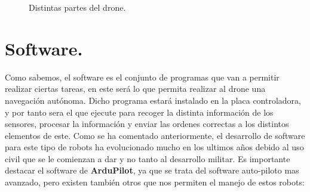 \begin{figure}[H]
 \centering
 \caption{Distintas partes del drone.}
 \label{f:Test 1}
\end{figure} 


\section{Software.}
\hspace{1 cm} Como sabemos, el software es el conjunto de programas que van a permitir realizar ciertas tareas, en este ser\'a lo que permita realizar al drone una navegaci\'on aut\'onoma. Dicho programa estar\'a instalado en la placa controladora, y por tanto sera el que ejecute para recoger la distinta informaci\'on de los sensores, procesar la informaci\'on y enviar las ordenes correctas a los distintos elementos de este. Como se ha comentado anteriormente, el desarrollo de software para este tipo de robots ha evolucionado mucho en los ultimos años debido al uso civil que se le comienzan a dar y no tanto al desarrollo militar. Es importante destacar el software de \textbf{ArduPilot}, ya que se trata del software auto-piloto mas avanzado, pero existen tambi\'en otros que nos permiten el manejo de estos robots:

